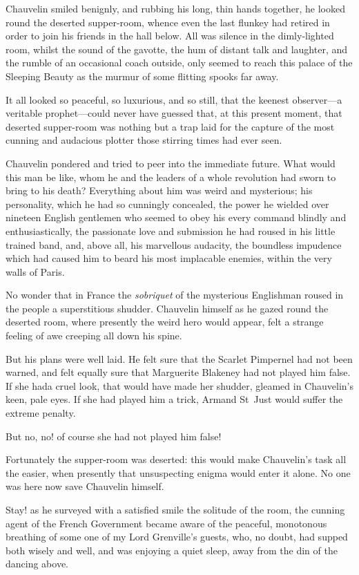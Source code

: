 Chauvelin smiled benignly, and rubbing his long, thin hands together, he looked round the deserted supper-room, whence even the last flunkey had retired in order to join his friends in the hall below. All was silence in the dimly-lighted room, whilst the sound of the gavotte, the hum of distant talk and laughter, and the rumble of an occasional coach outside, only seemed to reach this palace of the Sleeping Beauty as the murmur of some flitting spooks far away.

It all looked so peaceful, so luxurious, and so still, that the keenest observer—a veritable prophet—could never have guessed that, at this present moment, that deserted supper-room was nothing but a trap laid for the capture of the most cunning and audacious plotter those stirring times had ever seen.

Chauvelin pondered and tried to peer into the immediate future. What would this man be like, whom he and the leaders of a whole revolution had sworn to bring to his death? Everything about him was weird and mysterious; his personality, which he had so cunningly concealed, the power he wielded over nineteen English gentlemen who seemed to obey his every command blindly and enthusiastically, the passionate love and submission he had roused in his little trained band, and, above all, his marvellous audacity, the boundless impudence which had caused him to beard his most implacable enemies, within the very walls of Paris.

No wonder that in France the \textit{sobriquet} of the mysterious Englishman roused in the people a superstitious shudder. Chauvelin himself as he gazed round the deserted room, where presently the weird hero would appear, felt a strange feeling of awe creeping all down his spine.

But his plans were well laid. He felt sure that the Scarlet Pimpernel had not been warned, and felt equally sure that Marguerite Blakeney had not played him false. If she had\textellipsis \allowbreak  a cruel look, that would have made her shudder, gleamed in Chauvelin's keen, pale eyes. If she had played him a trick, Armand St~Just would suffer the extreme penalty.

But no, no! of course she had not played him false!

Fortunately the supper-room was deserted: this would make Chauve\-lin's task all the easier, when presently that unsuspecting enigma would enter it alone. No one was here now save Chauvelin himself.

Stay! as he surveyed with a satisfied smile the solitude of the room, the cunning agent of the French Government became aware of the peaceful, monotonous breathing of some one of my Lord Grenville's guests, who, no doubt, had supped both wisely and well, and was enjoying a quiet sleep, away from the din of the dancing above.

